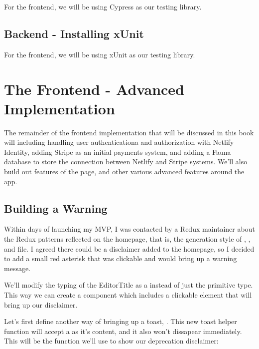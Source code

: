 \documentclass[a4paper,headinclude=on,footinclude=on,12pt,oneside]{scrbook}
\begin{document}
For the frontend, we will be using Cypress as our testing library.

\section{Backend - Installing xUnit}

For the frontend, we will be using xUnit as our testing library.

\chapter{The Frontend - Advanced Implementation}

The remainder of the frontend implementation that will be discussed in this book will including handling user authenticationa and authorization with Netlify Identity, adding Stripe as an initial payments system, and adding a Fauna database to store the connection between Netlify and Stripe systems. We'll also build out features of the  page, and other various advanced features around the app.

\section{Building a Warning}

Within days of launching my MVP, I was contacted by a Redux maintainer about the Redux patterns reflected on the homepage, that is, the generation style of , , and  file. I agreed there could be a disclaimer added to the homepage, so I decided to add a small red asterisk that was clickable and would bring up a warning message.


We'll modify the typing of the EditorTitle as a  instead of just the primitive  type. This way we can create a component which includes a clickable element that will bring up our disclaimer.


Let's first define another way of bringing up a toast, . This new toast helper function will accept a  as it's content, and it also won't dissapear immediately. This will be the function we'll use to show our deprecation disclaimer:
\end{document}
